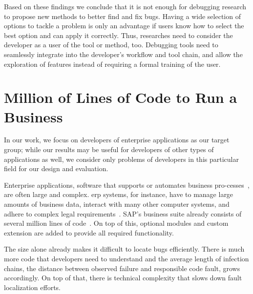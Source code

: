
Based on these findings we conclude that it is not enough for debugging research to propose new methods to better find and fix bugs.
Having a wide selection of options to tackle a problem is only an advantage if users know how to select the best option and can apply it correctly.
Thus, researches need to consider the developer as a user of the tool or method, too.
Debugging tools need to seamlessly integrate into the developer's workflow and tool chain, and allow the exploration of features instead of requiring a formal training of the user.

\section{Million of Lines of Code to Run a Business}

In our work, we focus on developers of enterprise applications as our target group;
\ie while our results may be useful for developers of other types of applications as well, we consider only problems of developers in this particular field for our design and evaluation.

Enterprise applications, \ie software that supports or automates business pro-\linebreak{}cesses~\cite{fowler02:patterns_of_enterprise_application}, are often large and complex.
\Ac{erp} systems, for instance, have to manage large amounts of business data, interact with many other computer systems, and adhere to complex legal requirements~\cite{linthicum00:enterprise_application_integration}.
SAP’s business suite already consists of several million lines of code~\cite{mallach15:information_systems_what_every}. 
On top of this, optional modules and custom extension are added to provide all required functionality.

The size alone already makes it difficult to locate bugs efficiently.
There is much more code that developers need to understand and the average length of infection chains, the distance between observed failure and responsible code fault, grows accordingly.
On top of that, there is technical complexity that slows down fault localization efforts.

